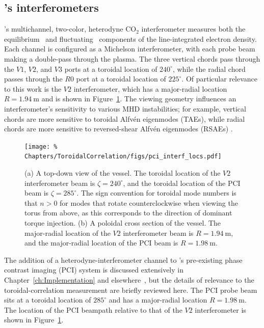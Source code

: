 \subsection{\diiid's interferometers}
\label{sec:ToroidalCorrelation:Interferometers:diiid}
\diiid's multichannel, two-color, heterodyne CO$_2$ interferometer
measures both the equilibrium~\cite{carlstrom_rsi88} and
fluctuating~\cite{vanzeeland_ppcf05, pace_nf17} components
of the line-integrated electron density.
Each channel is configured as a Michelson interferometer,
with each probe beam making a double-pass through the plasma.
The three vertical chords pass through the $V1$, $V2$, and $V3$ ports
at a toroidal location of $240^{\circ}$, while
the radial chord passes through the $R0$ port
at a toroidal location of $225^{\circ}$.
Of particular relevance to this work is the $V2$ interferometer,
which has a major-radial location $R = \SI{1.94}{\meter}$ and
is shown in Figure~\ref{fig:ToroidalCorrelation:pci_interf_locs}.
The viewing geometry influences
an interferometer's sensitivity to various MHD instabilities;
for example, vertical chords are more sensitive to
toroidal Alfv\'{e}n eigenmodes (TAEs), while
radial chords are more sensitive to
reversed-shear Alfv\'{e}n eigenmodes (RSAEs)
\cite{vanzeeland_ppcf05}.

\begin{figure}
  \centering
  \texttt{[image: \%
    Chapters/ToroidalCorrelation/figs/pci\_interf\_locs.pdf]}
  \caption[Locations of the $V2$ and PCI interferometer beams on \diiid]{%
    (a) A top-down view of the \diiid\space vessel.
    The toroidal location of the $V2$ interferometer beam
    is $\zeta = 240^{\circ}$,
    and the toroidal location of the PCI beam
    is $\zeta = 285^{\circ}$.
    The \diiid\space sign convention for toroidal mode numbers
    is that $n > 0$ for modes that rotate counterclockwise
    when viewing the torus from above,
    as this corresponds to the direction of dominant torque injection.
    (b) A poloidal cross section of the \diiid\space vessel.
    The major-radial location of the $V2$ interferometer beam
    is $R = \SI{1.94}{\meter}$, and
    the major-radial location of the PCI beam
    is $R = \SI{1.98}{\meter}$.}
\label{fig:ToroidalCorrelation:pci_interf_locs}
\end{figure}

The addition of a heterodyne-interferometer channel
to \diiid's pre-existing phase contrast imaging (PCI) system
is discussed extensively in
Chapter~\ref{ch:Implementation} and
elsewhere~\cite{davis_rsi16}, but
the details of relevance to the toroidal-correlation measurement
are briefly reviewed here.
The PCI probe beam sits at a toroidal location of $285^{\circ}$ and
has a major-radial location $R = \SI{1.98}{\meter}$.
The location of the PCI beampath relative to that of the $V2$ interferometer
is shown in Figure~\ref{fig:ToroidalCorrelation:pci_interf_locs}.

